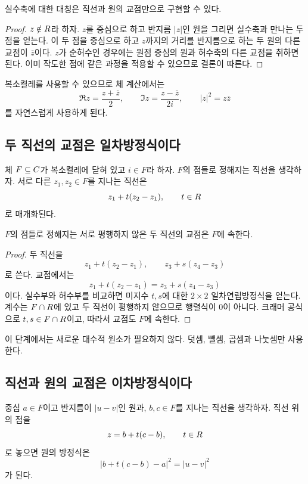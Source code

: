 \begin{proofidea}
실수축에 대한 대칭은 직선과 원의 교점만으로 구현할 수 있다.
\end{proofidea}

\begin{proof}
$z\notin R$라 하자. $z$를 중심으로 하고 반지름 $|z|$인 원을 그리면 실수축과 만나는 두 점을 얻는다. 이 두 점을 중심으로 하고 $z$까지의 거리를 반지름으로 하는 두 원의 다른 교점이 $\overline z$이다. $z$가 순허수인 경우에는 원점 중심의 원과 허수축의 다른 교점을 취하면 된다. 이미 작도한 점에 같은 과정을 적용할 수 있으므로 결론이 따른다.
\end{proof}

복소켤레를 사용할 수 있으므로 체 계산에서는
\[
  \Re z=\frac{z+\overline z}{2},
  \qquad
  \Im z=\frac{z-\overline z}{2i},
  \qquad
  |z|^2=z\overline z
\]
를 자연스럽게 사용하게 된다.

\subsection{두 직선의 교점은 일차방정식이다}

체 $F\subseteq C$가 복소켤레에 닫혀 있고 $i\in F$라 하자. $F$의 점들로 정해지는 직선을 생각하자. 서로 다른 $z_1,z_2\in F$를 지나는 직선은
\[
  z_1+t(z_2-z_1),
  \qquad t\in R
\]
로 매개화된다.

\begin{proposition}[직선--직선 교점]
$F$의 점들로 정해지는 서로 평행하지 않은 두 직선의 교점은 $F$에 속한다.
\end{proposition}

\begin{proof}
두 직선을
\[
  z_1+t(z_2-z_1),
  \qquad
  z_3+s(z_4-z_3)
\]
로 쓴다. 교점에서는
\[
  z_1+t(z_2-z_1)=z_3+s(z_4-z_3)
\]
이다. 실수부와 허수부를 비교하면 미지수 $t,s$에 대한 $2\times2$ 일차연립방정식을 얻는다. 계수는 $F\cap R$에 있고 두 직선이 평행하지 않으므로 행렬식이 $0$이 아니다. 크래머 공식으로 $t,s\in F\cap R$이고, 따라서 교점도 $F$에 속한다.
\end{proof}

이 단계에서는 새로운 대수적 원소가 필요하지 않다. 덧셈, 뺄셈, 곱셈과 나눗셈만 사용한다.

\subsection{직선과 원의 교점은 이차방정식이다}

중심 $a\in F$이고 반지름이 $|u-v|$인 원과, $b,c\in F$를 지나는 직선을 생각하자. 직선 위의 점을
\[
  z=b+t(c-b),
  \qquad t\in R
\]
로 놓으면 원의 방정식은
\[
  |b+t(c-b)-a|^2=|u-v|^2
\]
가 된다.

